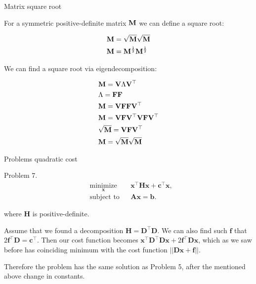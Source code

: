 \documentclass{beamer}
\begin{document}
\begin{frame}{Matrix square root}
	\begin{flushleft}
		
		For a symmetric positive-definite matrix $\mathbf{M}$ we can define a square root:
		
		\begin{align}
			\mathbf{M} &= \sqrt{\mathbf{M} } \sqrt{\mathbf{M} }
			\\
			\mathbf{M} &= \mathbf{M}^\frac{1}{2} \mathbf{M}^\frac{1}{2}
		\end{align}
		
		We can find a square root via eigendecomposition:
		
		\begin{align}
			& \mathbf{M} = \mathbf{V} \Lambda \mathbf{V}^\top 
			\\
			&  \Lambda =  \mathbf{F} \mathbf{F}
			\\
			& \mathbf{M} = \mathbf{V} \mathbf{F} \mathbf{F} \mathbf{V}^\top 
			\\
			& \mathbf{M} = \mathbf{V} \mathbf{F} \mathbf{V}^\top\mathbf{V}  \mathbf{F} \mathbf{V}^\top 
			\\
			& \sqrt{\mathbf{M} }  = \mathbf{V} \mathbf{F} \mathbf{V}^\top
			\\
			&\mathbf{M} = \sqrt{\mathbf{M} } \sqrt{\mathbf{M} } 
		\end{align}
		
		
		
	\end{flushleft}
\end{frame}




\begin{frame}{Problems quadratic cost}
	\begin{flushleft}
		
		Problem 7. 
		\begin{equation}
			\begin{aligned}
				& \underset{\mathbf{x}}{\text{minimize}}
				& & \mathbf{x}^\top \mathbf{H} \mathbf{x} + \mathbf{c}^\top\mathbf{x}, \\
				& \text{subject to}
				& & \mathbf{A} \mathbf{x} = \mathbf{b}.
			\end{aligned}
		\end{equation}
		
		where $\mathbf{H}$ is positive-definite.
		
		\bigskip
		
		Assume that we found a decomposition $\mathbf{H} = \mathbf{D}^\top\mathbf{D}$. We can also find such $\mathbf{f}$ that $2\mathbf{f}^\top\mathbf{D} = \mathbf{c}^\top$. Then our cost function becomes $\mathbf{x}^\top \mathbf{D}^\top\mathbf{D} \mathbf{x} + 2\mathbf{f}^\top\mathbf{D}\mathbf{x}$, which as we saw before has coinciding minimum with the cost function $||\mathbf{D}\mathbf{x} + \mathbf{f}||$.
		
		\bigskip
		
		Therefore the problem has the same solution as Problem 5, after the mentioned above change in constants.
		
	\end{flushleft}
\end{frame}
\end{document}
